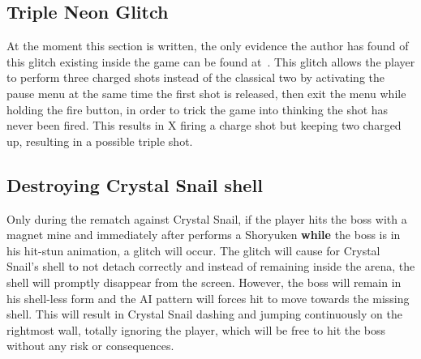 \subsection{Triple Neon Glitch}
At the moment this section is written, the only evidence the author has found of this glitch existing inside the game can be found at~\cite{video:triple_glitch}. This glitch allows the player to perform three charged shots instead of the classical two by activating the pause menu at the same time the first shot is released, then exit the menu while holding the fire button, in order to trick the game into thinking the shot has never been fired. This results in X firing a charge shot but keeping two charged up, resulting in a possible triple shot.



\subsection{Destroying Crystal Snail shell}
Only during the rematch against Crystal Snail, if the player hits the boss with a magnet mine and immediately after performs a Shoryuken \textbf{while} the boss is in his hit-stun animation, a glitch will occur. The glitch will cause for Crystal Snail's shell to not detach correctly and  instead of remaining inside the arena, the shell will promptly disappear from the screen. However, the boss will remain in his shell-less form and the AI pattern will forces hit to move towards the missing shell. This will result in Crystal Snail dashing and jumping continuously on the rightmost wall, totally ignoring the player, which will be free to hit the boss without any risk or consequences.

